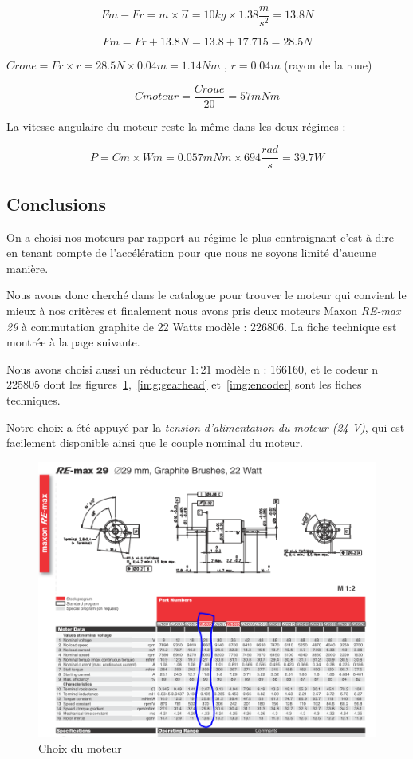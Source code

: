 $$Fm - Fr = m \times \overrightarrow{a} = 10 kg \times 1.38 \frac{m}{s^{2}} = 13.8 N$$

$$Fm =Fr + 13.8 N = 13.8 + 17.715 = 28.5 N$$
  
$Croue = Fr \times r = 28.5 N  \times 0.04m = 1.14 Nm$ , $r = 0.04m$ (rayon de la roue)

$$Cmoteur = \frac {Croue}{20} = 57 mNm$$

La vitesse angulaire du moteur reste la même dans les deux régimes :

$$P = Cm \times Wm = 0.057 mNm \times 694 \frac {rad}{s} = 39.7 W$$

\subsection{Conclusions}
On a choisi nos moteurs par rapport au régime le plus contraignant c’est à dire en tenant compte de l’accélération pour que nous ne soyons limité d'aucune manière.
  
\noindent Nous avons donc cherché dans le catalogue pour trouver le moteur qui convient le mieux à nos critères et finalement nous avons pris deux moteurs Maxon \textit{RE-max 29} à commutation graphite de {22 Watts} modèle : 226806. La fiche technique est montrée à la page suivante.

\noindent Nous avons choisi aussi un réducteur $1:21$ modèle n : 166160, et le codeur n 225805 dont les figures~\ref{img:moteur},~\ref{img:gearhead} et~\ref{img:encoder} sont les fiches techniques.

\noindent Notre choix a été appuyé par la \textit{tension d’alimentation du moteur (24 V)}, qui est facilement disponible ainsi que le {couple nominal du moteur}.

\begin{figure}[!hp]
	\centering
	\includegraphics[width=15cm]{Moteur.PNG}
	\caption{Choix du moteur}
	\label{img:moteur}
\end{figure}

